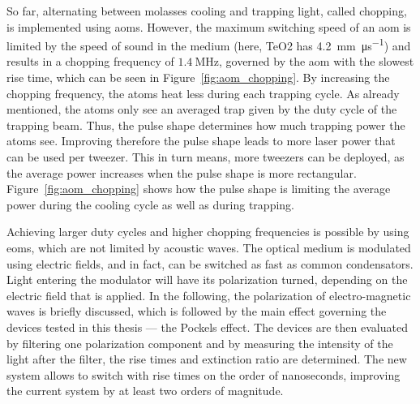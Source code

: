 So far, alternating between molasses cooling and trapping light, called chopping, is implemented using \acp{aom}. However, the maximum switching speed of an \ac{aom} is limited by the speed of sound in the medium (here, TeO2 has \SI{4.2}{\milli\meter\per\micro\second}) and results in a chopping frequency of $\SI{1.4}{\mega\hertz}$, governed by the \ac{aom} with the slowest rise time, which can be seen in Figure~\ref{fig:aom_chopping}. By increasing the chopping frequency, the atoms heat less during each trapping cycle. As already mentioned, the atoms only see an averaged trap given by the duty cycle of the trapping beam. Thus, the pulse shape determines how much trapping power the atoms see. Improving therefore the pulse shape leads to more laser power that can be used per tweezer. This in turn means, more tweezers can be deployed, as the average power increases when the pulse shape is more rectangular. Figure~\ref{fig:aom_chopping} shows how the pulse shape is limiting the average power during the cooling cycle as well as during trapping.

\begin{figure}[t]%
\end{figure}

Achieving larger duty cycles and higher chopping frequencies is possible by using \acp{eom}, which are not limited by acoustic waves. The optical medium is modulated using electric fields, and in fact, can be switched as fast as common condensators\docite{}. Light entering the modulator will have its polarization turned, depending on the electric field that is applied. In the following, the polarization of electro-magnetic waves is briefly discussed, which is followed by the main effect governing the devices tested in this thesis --- the Pockels effect. The devices are then evaluated by filtering one polarization component and by measuring the intensity of the light after the filter, the rise times and extinction ratio are determined. The new system allows to switch with rise times on the order of nanoseconds, improving the current system by at least two orders of magnitude.

